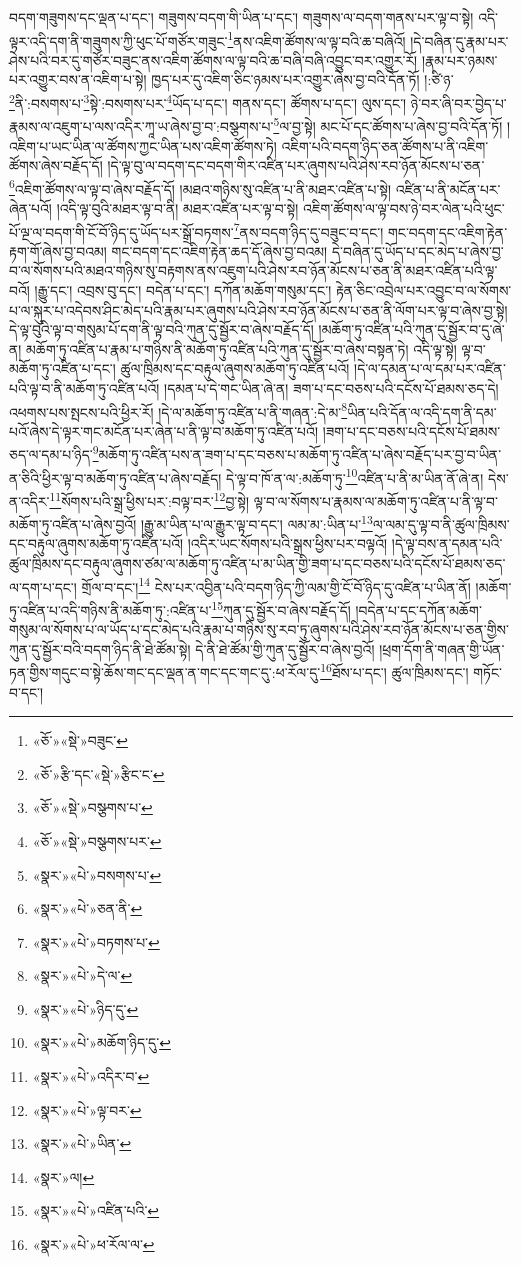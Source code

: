 བདག་གཟུགས་དང་ལྡན་པ་དང་། གཟུགས་བདག་གི་ཡིན་པ་དང་། གཟུགས་ལ་བདག་གནས་པར་ལྟ་བ་སྟེ། འདི་ལྟར་འདི་དག་ནི་གཟུགས་ཀྱི་ཕུང་པོ་གཙོར་གཟུང་\footnote{«ཅོ་»«སྡེ་»བཟུང་}ནས་འཇིག་ཚོགས་ལ་ལྟ་བའི་ཆ་བཞིའོ། །དེ་བཞིན་དུ་རྣམ་པར་ཤེས་པའི་བར་དུ་གཙོར་བཟུང་ནས་འཇིག་ཚོགས་ལ་ལྟ་བའི་ཆ་བཞི་བཞི་འབྱུང་བར་འགྱུར་རོ། །རྣམ་པར་ཉམས་པར་འགྱུར་བས་ན་འཇིག་པ་སྟེ། ཁྱད་པར་དུ་འཇིག་ཅིང་ཉམས་པར་འགྱུར་ཞེས་བྱ་བའི་དོན་ཏོ། །:ཙི་ཉ་\footnote{«ཅོ་»རྩི་དང་«སྡེ་»རྩིང་ང་}ནི་:བསགས་པ་\footnote{«ཅོ་»«སྡེ་»བསྩགས་པ་}སྟེ་:བསགས་པར་\footnote{«ཅོ་»«སྡེ་»བསྩགས་པར་}ཡོད་པ་དང་། གནས་དང་། ཚོགས་པ་དང་། ལུས་དང་། ཉེ་བར་ཞི་བར་བྱེད་པ་རྣམས་ལ་འཇུག་པ་ལས་འདིར་ཀཱ་ཡ་ཞེས་བྱ་བ་:བསྩགས་པ་\footnote{«སྣར་»«པེ་»བསགས་པ་}ལ་བྱ་སྟེ། མང་པོ་དང་ཚོགས་པ་ཞེས་བྱ་བའི་དོན་ཏོ། །འཇིག་པ་ཡང་ཡིན་ལ་ཚོགས་ཀྱང་ཡིན་པས་འཇིག་ཚོགས་ཏེ། འཇིག་པའི་བདག་ཉིད་ཅན་ཚོགས་པ་ནི་འཇིག་ཚོགས་ཞེས་བརྗོད་དོ། །དེ་ལྟ་བུ་ལ་བདག་དང་བདག་གིར་འཛིན་པར་ཞུགས་པའི་ཤེས་རབ་ཉོན་མོངས་པ་ཅན་\footnote{«སྣར་»«པེ་»ཅན་ནི་}འཇིག་ཚོགས་ལ་ལྟ་བ་ཞེས་བརྗོད་དོ། །མཐའ་གཉིས་སུ་འཛིན་པ་ནི་མཐར་འཛིན་པ་སྟེ། འཛིན་པ་ནི་མངོན་པར་ཞེན་པའོ། །འདི་ལྟ་བུའི་མཐར་ལྟ་བ་ནི། མཐར་འཛིན་པར་ལྟ་བ་སྟེ། འཇིག་ཚོགས་ལ་ལྟ་བས་ཉེ་བར་ལེན་པའི་ཕུང་པོ་ལྔ་ལ་བདག་གི་ངོ་བོ་ཉིད་དུ་ཡོད་པར་སྒྲོ་བཏགས་\footnote{«སྣར་»«པེ་»བཏགས་པ་}ནས་བདག་ཉིད་དུ་བཟུང་བ་དང་། གང་བདག་དང་འཇིག་རྟེན་རྟག་གོ་ཞེས་བྱ་བའམ། གང་བདག་དང་འཇིག་རྟེན་ཆད་དོ་ཞེས་བྱ་བའམ། དེ་བཞིན་དུ་ཡོད་པ་དང་མེད་པ་ཞེས་བྱ་བ་ལ་སོགས་པའི་མཐའ་གཉིས་སུ་བརྟགས་ནས་འཇུག་པའི་ཤེས་རབ་ཉོན་མོངས་པ་ཅན་ནི་མཐར་འཛིན་པའི་ལྟ་བའོ། །རྒྱུ་དང་། འབྲས་བུ་དང་། བདེན་པ་དང་། དཀོན་མཆོག་གསུམ་དང་། རྟེན་ཅིང་འབྲེལ་པར་འབྱུང་བ་ལ་སོགས་པ་ལ་སྐུར་པ་འདེབས་ཤིང་མེད་པའི་རྣམ་པར་ཞུགས་པའི་ཤེས་རབ་ཉོན་མོངས་པ་ཅན་ནི་ལོག་པར་ལྟ་བ་ཞེས་བྱ་སྟེ། དེ་ལྟ་བུའི་ལྟ་བ་གསུམ་པོ་དག་ནི་ལྟ་བའི་ཀུན་དུ་སྦྱོར་བ་ཞེས་བརྗོད་དོ། །མཆོག་ཏུ་འཛིན་པའི་ཀུན་དུ་སྦྱོར་བ་དུ་ཞེ་ན། མཆོག་ཏུ་འཛིན་པ་རྣམ་པ་གཉིས་ནི་མཆོག་ཏུ་འཛིན་པའི་ཀུན་དུ་སྦྱོར་བ་ཞེས་བསྟན་ཏེ། འདི་ལྟ་སྟེ། ལྟ་བ་མཆོག་ཏུ་འཛིན་པ་དང་། ཚུལ་ཁྲིམས་དང་བརྟུལ་ཞུགས་མཆོག་ཏུ་འཛིན་པའོ། །དེ་ལ་དམན་པ་ལ་དམ་པར་འཛིན་པའི་ལྟ་བ་ནི་མཆོག་ཏུ་འཛིན་པའོ། །དམན་པ་དེ་གང་ཡིན་ཞེ་ན། ཟག་པ་དང་བཅས་པའི་དངོས་པོ་ཐམས་ཅད་དེ། འཕགས་པས་སྤངས་པའི་ཕྱིར་རོ། །དེ་ལ་མཆོག་ཏུ་འཛིན་པ་ནི་གཞན་:དེ་མ་\footnote{«སྣར་»«པེ་»དེ་ལ་}ཡིན་པའི་དོན་ལ་འདི་དག་ནི་དམ་པའོ་ཞེས་དེ་ལྟར་གང་མངོན་པར་ཞེན་པ་ནི་ལྟ་བ་མཆོག་ཏུ་འཛིན་པའོ། །ཟག་པ་དང་བཅས་པའི་དངོས་པོ་ཐམས་ཅད་ལ་དམ་པ་ཉིད་\footnote{«སྣར་»«པེ་»ཉིད་དུ་}མཆོག་ཏུ་འཛིན་པས་ན་ཟག་པ་དང་བཅས་པ་མཆོག་ཏུ་འཛིན་པ་ཞེས་བརྗོད་པར་བྱ་བ་ཡིན་ན་ཅིའི་ཕྱིར་ལྟ་བ་མཆོག་ཏུ་འཛིན་པ་ཞེས་བརྗོད། དེ་ལྟ་བ་ཁོ་ན་ལ་:མཆོག་ཏུ་\footnote{«སྣར་»«པེ་»མཆོག་ཉིད་དུ་}འཛིན་པ་ནི་མ་ཡིན་ནོ་ཞེ་ན། དེས་ན་འདིར་\footnote{«སྣར་»«པེ་»འདིར་བ་}སོགས་པའི་སྒྲ་ཕྱིས་པར་:བལྟ་བར་\footnote{«སྣར་»«པེ་»ལྟ་བར་}བྱ་སྟེ། ལྟ་བ་ལ་སོགས་པ་རྣམས་ལ་མཆོག་ཏུ་འཛིན་པ་ནི་ལྟ་བ་མཆོག་ཏུ་འཛིན་པ་ཞེས་བྱའོ། །རྒྱུ་མ་ཡིན་པ་ལ་རྒྱུར་ལྟ་བ་དང་། ལམ་མ་:ཡིན་པ་\footnote{«སྣར་»«པེ་»ཡིན་}ལ་ལམ་དུ་ལྟ་བ་ནི་ཚུལ་ཁྲིམས་དང་བརྟུལ་ཞུགས་མཆོག་ཏུ་འཛིན་པའོ། །འདིར་ཡང་སོགས་པའི་སྒྲས་ཕྱིས་པར་བལྟའོ། །དེ་ལྟ་བས་ན་དམན་པའི་ཚུལ་ཁྲིམས་དང་བརྟུལ་ཞུགས་ཙམ་ལ་མཆོག་ཏུ་འཛིན་པ་མ་ཡིན་གྱི་ཟག་པ་དང་བཅས་པའི་དངོས་པོ་ཐམས་ཅད་ལ་དག་པ་དང་། གྲོལ་བ་དང་།\footnote{«སྣར་»ལ།} ངེས་པར་འབྱིན་པའི་བདག་ཉིད་ཀྱི་ལམ་གྱི་ངོ་བོ་ཉིད་དུ་འཛིན་པ་ཡིན་ནོ། །མཆོག་ཏུ་འཛིན་པ་འདི་གཉིས་ནི་མཆོག་ཏུ་:འཛིན་པ་\footnote{«སྣར་»«པེ་»འཛིན་པའི་}ཀུན་དུ་སྦྱོར་བ་ཞེས་བརྗོད་དོ། །བདེན་པ་དང་དཀོན་མཆོག་གསུམ་ལ་སོགས་པ་ལ་ཡོད་པ་དང་མེད་པའི་རྣམ་པ་གཉིས་སུ་རབ་ཏུ་ཞུགས་པའི་ཤེས་རབ་ཉོན་མོངས་པ་ཅན་གྱིས་ཀུན་དུ་སྦྱོར་བའི་བདག་ཉིད་ནི་ཐེ་ཚོམ་སྟེ། དེ་ནི་ཐེ་ཚོམ་གྱི་ཀུན་དུ་སྦྱོར་བ་ཞེས་བྱའོ། །ཕྲག་དོག་ནི་གཞན་གྱི་ཡོན་ཏན་གྱིས་གདུང་བ་སྟེ་ཆོས་གང་དང་ལྡན་ན་གང་དང་གང་དུ་:ཕ་རོལ་དུ་\footnote{«སྣར་»«པེ་»ཕ་རོལ་ལ་}ཐོས་པ་དང་། ཚུལ་ཁྲིམས་དང་། གཏོང་བ་དང་། 